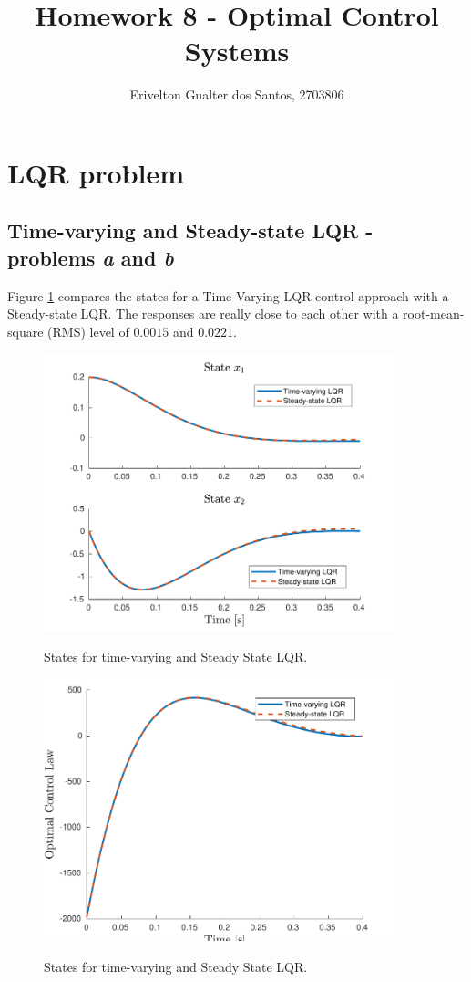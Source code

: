 \documentclass{article}
\begin{document}
\title{Homework 8 - Optimal Control Systems}
\author{Erivelton Gualter dos Santos, 2703806}
\date{}

\maketitle 

\section{LQR problem}
\subsection*{Time-varying and Steady-state LQR - problems \textit{a} and \textit{b}}

Figure \ref{states1} compares the states for a Time-Varying LQR control approach with a Steady-state LQR. The responses are really close to each other with a root-mean-square (RMS) level of $0.0015$ and $0.0221$.
\begin{figure}[H] 
\centering
\includegraphics [width=4in]{states1} \label{states1}
\caption{States for time-varying and Steady State LQR.}
\end{figure}

\begin{figure}[H] 
\centering
\includegraphics [width=4in]{control1} \label{control1}
\caption{States for time-varying and Steady State LQR.}
\end{figure}
\end{document}
